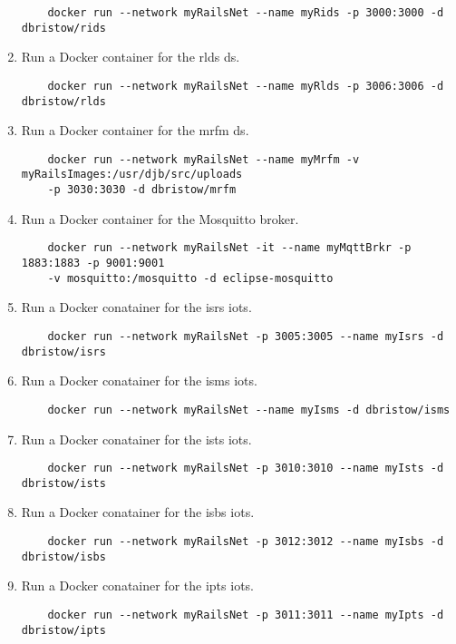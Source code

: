 \begin{enumerate}
    \begin{verbatim}
    docker run --network myRailsNet --name myRids -p 3000:3000 -d dbristow/rids
    \end{verbatim}
    \item Run a Docker container for the \gls{rlds} \gls{ds}.
    \begin{verbatim}
    docker run --network myRailsNet --name myRlds -p 3006:3006 -d dbristow/rlds
    \end{verbatim}
    \item Run a Docker container for the \gls{mrfm} \gls{ds}.
    \begin{verbatim}
    docker run --network myRailsNet --name myMrfm -v myRailsImages:/usr/djb/src/uploads 
    -p 3030:3030 -d dbristow/mrfm
    \end{verbatim}
    \item Run a Docker container for the Mosquitto broker.
    \begin{verbatim}
    docker run --network myRailsNet -it --name myMqttBrkr -p 1883:1883 -p 9001:9001
    -v mosquitto:/mosquitto -d eclipse-mosquitto
    \end{verbatim}
    \item Run a Docker conatainer for the \gls{isrs} \gls{iots}.
    \begin{verbatim}
    docker run --network myRailsNet -p 3005:3005 --name myIsrs -d dbristow/isrs
    \end{verbatim}
    \item Run a Docker conatainer for the \gls{isms} \gls{iots}.
    \begin{verbatim}
    docker run --network myRailsNet --name myIsms -d dbristow/isms
    \end{verbatim}
    \item Run a Docker conatainer for the \gls{ists} \gls{iots}.
    \begin{verbatim}
    docker run --network myRailsNet -p 3010:3010 --name myIsts -d dbristow/ists
    \end{verbatim}
    \item Run a Docker conatainer for the \gls{isbs} \gls{iots}.
    \begin{verbatim}
    docker run --network myRailsNet -p 3012:3012 --name myIsbs -d dbristow/isbs
    \end{verbatim}
    \item Run a Docker conatainer for the \gls{ipts} \gls{iots}.
    \begin{verbatim}
    docker run --network myRailsNet -p 3011:3011 --name myIpts -d dbristow/ipts

\end{verbatim}
\end{enumerate}
